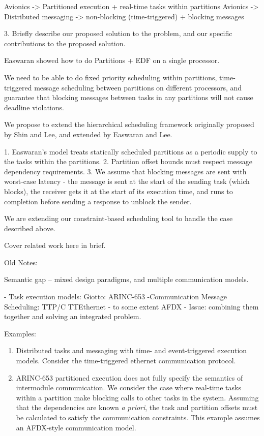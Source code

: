 Avionics -> Partitioned execution + real-time tasks within partitions
Avionics -> Distributed messaging -> non-blocking (time-triggered) + blocking messages


3. Briefly describe our proposed solution to the problem, and our specific 
   contributions to the proposed solution.

Easwaran showed how to do Partitions + EDF on a single processor.

We need to be able to do fixed priority scheduling within partitions, 
time-triggered message scheduling between partitions on different processors,
and guarantee that blocking messages between tasks in any partitions will not
cause deadline violations.

We propose to extend the hierarchical scheduling framework originally proposed
by Shin and Lee, and extended by Easwaran and Lee.

1. Easwaran's model treats statically scheduled partitions as a periodic 
   supply to the tasks within the partitions.
2. Partition offset bounds must respect message dependency requirements.
3. We assume that blocking messages are sent with worst-case latency -
   the message is sent at the start of the sending task (which blocks), the
   receiver gets it at the start of its execution time, and runs to completion
   before sending a response to unblock the sender. 

We are extending our constraint-based scheduling tool to handle the case 
described above.

Cover related work here in brief.

Old Notes:


Semantic gap -- mixed design paradigms, and multiple communication models.

- Task execution models: Giotto: ARINC-653
-Communication Message Scheduling: TTP/C TTEthernet - to some extent AFDX
- Issue: combining them together and solving an integrated problem. 

Examples: 

\begin{enumerate}
\item Distributed tasks and messaging with time- and event-triggered execution
models.  Consider the time-triggered ethernet communication protocol.
\item ARINC-653 partitioned execution does not fully specify the semantics of
intermodule communication.  We consider the case where real-time tasks within a 
partition make blocking calls to other tasks in the system.  Assuming that the
dependencies are known \emph{a priori}, the task and partition offsets must be 
calculated to satisfy the communication constraints.  This example assumes an
AFDX-style communication model.
\end{enumerate}

